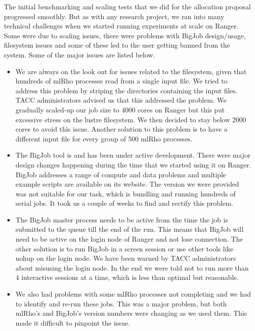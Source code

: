 \documentclass{sig-alternate}
\begin{document}
The initial benchmarking and scaling tests that we did for the allocation proposal progressed smoothly. But as with any research project, we ran into many technical challenges when we started running experiments at scale on Ranger. Some were due to scaling issues, there were problems with BigJob design/usage, filesystem issues and some of these led to the user getting banned from the system. Some of the major issues are listed below. 
\begin{itemize}
  \item We are always on the look out for issues related to the filesystem, given that hundreds of mlRho processes read from a single input file. We tried to address this problem by striping the directories containing the input files. TACC administrators advised us that this addressed the problem. We gradually scaled-up our job size to 4000 cores on Ranger but this put excessive stress on the lustre filesystem. We then decided to stay below 2000 cores to avoid this issue. Another solution to this problem is to have a different input file for every group of 500 mlRho processes. 

  \item The BigJob tool is and has been under active development. There were major design changes happening during the time that we started using it on Ranger. BigJob addresses a range of compute and data problems and multiple example scripts are available on its website. The version we were provided was not suitable for our task, which is bundling and running hundreds of serial jobs. It took us a couple of weeks to find and rectify this problem. 
  \item The BigJob master process needs to be active from the time the job is submitted to the queue till the end of the run. This means that BigJob will need to be active on the login node of Ranger and not lose connection. The other solution is to run BigJob in a screen session or use other tools like nohup on the login node. We have been warned by TACC administrators about misusing the login node. In the end we were told not to run more than 4 interactive sessions at a time, which is less than optimal but reasonable. 
  \item We also had problems with some mlRho processes not completing and we had to identify and re-run these jobs. This was a major problem, but both mlRho's and BigJob's version numbers were changing as we used them. This made it difficult to pinpoint the issue. 

\end{itemize}
\end{document}
